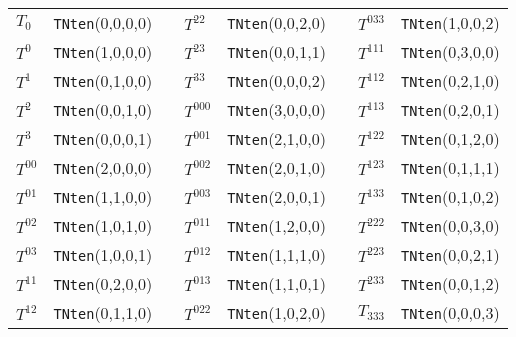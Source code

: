 \documentclass[preprint,sort&compress,12pt]{elsarticle}
\def\arraystretch{1.2}
\begin{document}
\begin{table}
\begin{center}
\renewcommand{\arraystretch}{1.2}
\renewcommand{\tabcolsep}{0.4em}
    \begin{tabular}{l|lcl|lcl|l}
$T_0$  & {\tt TNten}(0,0,0,0)   &\phantom{spa}& $T^{22}$ & {\tt TNten}(0,0,2,0) &\phantom{spa}& 
                               $T^{033}$ & {\tt TNten}(1,0,0,2) \\  
$T^0$  & {\tt TNten}(1,0,0,0)   &\phantom{spa}& $T^{23}$ & {\tt TNten}(0,0,1,1) &\phantom{spa}& 
                               $T^{111}$ & {\tt TNten}(0,3,0,0) \\  
$T^1$  & {\tt TNten}(0,1,0,0)   &\phantom{spa}& $T^{33}$ & {\tt TNten}(0,0,0,2) &\phantom{spa}& 
                               $T^{112}$ & {\tt TNten}(0,2,1,0) \\ 
$T^2$  & {\tt TNten}(0,0,1,0)   &\phantom{spa}& $T^{000}$ & {\tt TNten}(3,0,0,0) &\phantom{spa}& 
                               $T^{113}$ & {\tt TNten}(0,2,0,1) \\  
$T^3$  & {\tt TNten}(0,0,0,1)   &\phantom{spa}& $T^{001}$ & {\tt TNten}(2,1,0,0) &\phantom{spa}& 
                               $T^{122}$ & {\tt TNten}(0,1,2,0) \\  
$T^{00}$  & {\tt TNten}(2,0,0,0)   &\phantom{spa}& $T^{002}$ & {\tt TNten}(2,0,1,0) &\phantom{spa}& 
                               $T^{123}$ & {\tt TNten}(0,1,1,1) \\  
$T^{01}$  & {\tt TNten}(1,1,0,0)   &\phantom{spa}& $T^{003}$ & {\tt TNten}(2,0,0,1) &\phantom{spa}&
                               $T^{133}$ & {\tt TNten}(0,1,0,2) \\ 
$T^{02}$  & {\tt TNten}(1,0,1,0)   &\phantom{spa}& $T^{011}$ & {\tt TNten}(1,2,0,0) &\phantom{spa}&  
                               $T^{222}$ & {\tt TNten}(0,0,3,0) \\  
$T^{03}$  & {\tt TNten}(1,0,0,1)   &\phantom{spa}& $T^{012}$ & {\tt TNten}(1,1,1,0) &\phantom{spa}& 
                               $T^{223}$ & {\tt TNten}(0,0,2,1) \\  
$T^{11}$  & {\tt TNten}(0,2,0,0)   &\phantom{spa}& $T^{013}$ & {\tt TNten}(1,1,0,1) &\phantom{spa}& 
                               $T^{233}$ & {\tt TNten}(0,0,1,2) \\  
$T^{12}$  & {\tt TNten}(0,1,1,0)   &\phantom{spa}& $T^{022}$ & {\tt TNten}(1,0,2,0) &\phantom{spa}&
                               $T_{333}$ & {\tt TNten}(0,0,0,3) \\ 

\end{tabular}
\end{center}
\end{table}
\end{document}
